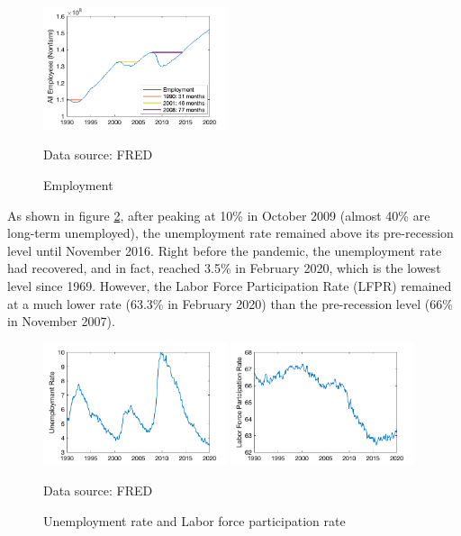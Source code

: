 \documentclass[12pt]{article}
\newcommand{\1}{\mathbb{1}}
\begin{document}
\begin{figure}[h!]
\centering
\includegraphics[width=0.48\textwidth]{Employment}
\caption{Employment}
{\small Data source: FRED} 
\label{Employment}
\end{figure}

As shown in figure \ref{UR_LFPR}, after peaking at 10\% in October 2009 (almost 40\% are long-term unemployed), the unemployment rate remained above its pre-recession level until November 2016. Right before the pandemic, the unemployment rate had recovered, and in fact, reached 3.5\% in February 2020, which is the lowest level since 1969. However, the Labor Force Participation Rate (LFPR) remained at a much lower rate (63.3\% in February 2020) than the pre-recession level (66\% in November 2007). \\

\begin{figure}[h!]
\centering
\includegraphics[width=0.48\textwidth]{UR}
\includegraphics[width=0.48\textwidth]{LFPR}
\caption{Unemployment rate and Labor force participation rate}
{\small Data source: FRED} 
\label{UR_LFPR}
\end{figure}
\end{document}
